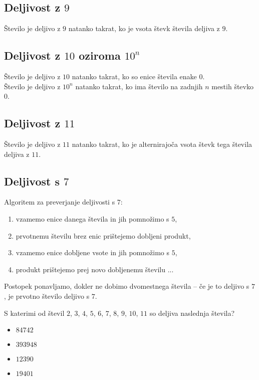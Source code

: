         \subsection*{Deljivost z $9$}
            Število je deljivo z $9$ natanko takrat, ko je vsota števk števila deljiva z $9$.

        \subsection*{Deljivost z $10$ oziroma $10^n$}
            Število je deljivo z $10$ natanko takrat, ko so enice števila enake $0$.
            \\Število je deljivo z $10^n$ natanko takrat, ko ima število na zadnjih $n$ mestih števko $0$.
    
        \subsection*{Deljivost z $11$}
            Število je deljivo z $11$ natanko takrat, ko je alternirajoča vsota števk tega števila deljiva z $11$.

        \subsection*{Deljivost s $7$}
            Algoritem za preverjanje deljivosti s $7$:
            \begin{enumerate}
                \item vzamemo enice danega števila in jih pomnožimo s $5$,
                \item prvotnemu številu brez enic prištejemo dobljeni produkt,
                \item vzamemo enice dobljene vsote in jih pomnožimo s $5$,
                \item produkt prištejemo prej novo dobljenemu številu ...     
            \end{enumerate}
            Postopek ponavljamo, dokler ne dobimo dvomestnega števila -- 
            če je to deljivo s $7$, je prvotno število deljivo s $7$. 
            
    

    
        \begin{naloga}
            S katerimi od števil $2$, $3$, $4$, $5$, $6$, $7$, $8$, $9$, $10$, $11$ so deljiva naslednja števila?
            \begin{itemize}
                \item $84742$ 
                \item $393948$ 
                \item $12390$ 
                \item $19401$ 
            \end{itemize}
        \end{naloga}
    

